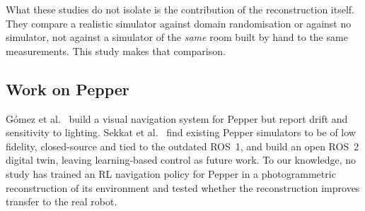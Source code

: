 What these studies do not isolate is the contribution of the reconstruction itself. They
compare a realistic simulator against domain randomisation or against no simulator, not against
a simulator of the \emph{same} room built by hand to the same measurements. This study makes
that comparison.

\subsection{Work on Pepper}
G\'{o}mez et al.\ \cite{gomez2018visual} build a visual navigation system for Pepper but report
drift and sensitivity to lighting. Sekkat et al.\ \cite{sekkat2024pepper} find existing Pepper
simulators to be of low fidelity, closed-source and tied to the outdated ROS~1, and build an open
ROS~2 digital twin, leaving learning-based control as future work. To our knowledge, no study has
trained an RL navigation policy for Pepper in a photogrammetric reconstruction of its environment
and tested whether the reconstruction improves transfer to the real robot.
